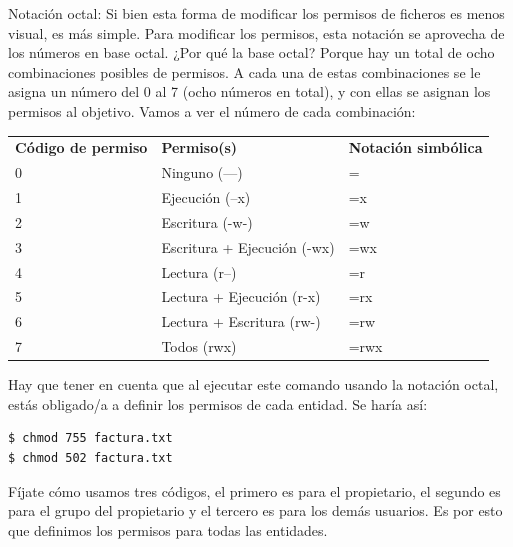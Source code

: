 Notación octal: Si bien esta forma de modificar los permisos de ficheros es menos visual, es más simple. Para modificar los permisos, esta notación se aprovecha de los números en base octal. ¿Por qué la base octal? Porque hay un total de ocho combinaciones posibles de permisos. A cada una de estas combinaciones se le asigna un número del 0 al 7 (ocho números en total), y con ellas se asignan los permisos al objetivo. Vamos a ver el número de cada combinación:

\begin{table}
\begin{tabular}{lll}
\textbf{Código de permiso} & \textbf{Permiso(s)}         & \textbf{Notación simbólica} \\
0                          & Ninguno (---)               & =                           \\
1                          & Ejecución (--x)             & =x                          \\
2                          & Escritura (-w-)             & =w                          \\
3                          & Escritura + Ejecución (-wx) & =wx                         \\
4                          & Lectura (r--)               & =r                          \\
5                          & Lectura + Ejecución (r-x)   & =rx                         \\
6                          & Lectura + Escritura (rw-)   & =rw                         \\
7                          & Todos (rwx)                 & =rwx                       
\end{tabular}
\end{table}

Hay que tener en cuenta que al ejecutar este comando usando la notación octal, estás obligado/a a definir los permisos de cada entidad. Se haría así:

\begin{tcolorbox-code}
\begin{lstlisting}
$ chmod 755 factura.txt
$ chmod 502 factura.txt
\end{lstlisting}
\end{tcolorbox-code}

Fíjate cómo usamos tres códigos, el primero es para el propietario, el segundo es para el grupo del propietario y el tercero es para los demás usuarios. Es por esto que definimos los permisos para todas las entidades.

